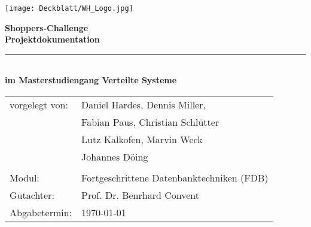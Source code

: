 \thispagestyle{plain}
\begin{titlepage}

\begin{center}

\texttt{[image: Deckblatt/WH\_Logo.jpg]}

\vspace{2cm}

\Huge{\textbf{Shoppers-Challenge}}\\[1.5ex]
\Large{\textbf{Projektdokumentation}}
\rule{\textwidth}{0.4pt}\\[3.0ex]

\large{\textbf{im Masterstudiengang Verteilte Systeme}}\\[3.0ex]

\normalsize
\begin{tabular}{ll}\\
	vorgelegt von: 
	& \quad Daniel Hardes, Dennis Miller, \\[1.2ex]
	& \quad Fabian Paus, Christian Schlütter\\[1.2ex]
	& \quad Lutz Kalkofen, Marvin Weck\\[1.2ex]
	& \quad Johannes Döing\\[1.2ex]
	& \quad \\[1.2ex]
	Modul:  & \quad Fortgeschrittene Datenbanktechniken (FDB) \\[1.2ex]
	Gutachter:  & \quad Prof. Dr. Benrhard Convent \\[1.2ex]
	Abgabetermin:  & \quad \today\\[1.2ex]
\end{tabular}

\end{center}

\end{titlepage}

